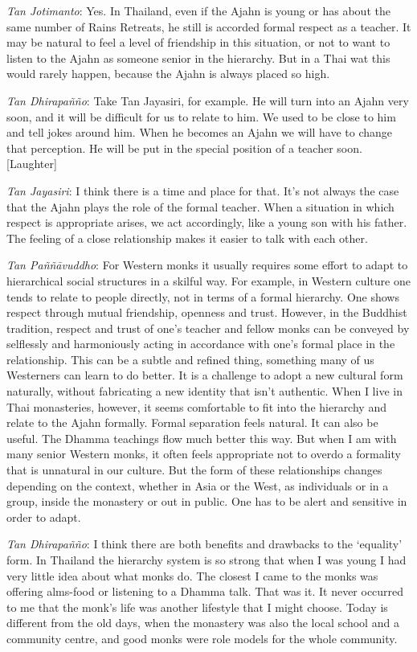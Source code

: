 \emph{Tan Jotimanto}: Yes. In Thailand, even if the Ajahn is young or
has about the same number of Rains Retreats, he still is accorded formal
respect as a teacher. It may be natural to feel a level of friendship in
this situation, or not to want to listen to the Ajahn as someone senior
in the hierarchy. But in a Thai wat this would rarely happen, because
the Ajahn is always placed so high.

\emph{Tan Dhirapañño}‎: Take Tan Jayasiri, for example. He will turn
into an Ajahn very soon, and it will be difficult for us to relate to
him. We used to be close to him and tell jokes around him. When he
becomes an Ajahn we will have to change that perception. He will be put
in the special position of a teacher soon. {[}Laughter{]}

\emph{Tan Jayasiri}: I think there is a time and place for that. It's
not always the case that the Ajahn plays the role of the formal teacher.
When a situation in which respect is appropriate arises, we act
accordingly, like a young son with his father. The feeling of a close
relationship makes it easier to talk with each other.

\emph{Tan Paññāvuddho}‎: For Western monks it usually requires some
effort to adapt to hierarchical social structures in a skilful way. For
example, in Western culture one tends to relate to people directly, not
in terms of a formal hierarchy. One shows respect through mutual
friendship, openness and trust. However, in the Buddhist tradition,
respect and trust of one's teacher and fellow monks can be conveyed by
selflessly and harmoniously acting in accordance with one's formal place
in the relationship. This can be a subtle and refined thing, something
many of us Westerners can learn to do better. It is a challenge to adopt
a new cultural form naturally, without fabricating a new identity that
isn't authentic. When I live in Thai monasteries, however, it seems
comfortable to fit into the hierarchy and relate to the Ajahn formally.
Formal separation feels natural. It can also be useful. The Dhamma
teachings flow much better this way. But when I am with many senior
Western monks, it often feels appropriate not to overdo a formality that
is unnatural in our culture. But the form of these relationships changes
depending on the context, whether in Asia or the West, as individuals or
in a group, inside the monastery or out in public. One has to be alert
and sensitive in order to adapt.

\emph{Tan Dhirapañño}‎: I think there are both benefits and drawbacks to
the `equality' form. In Thailand the hierarchy system is so strong that
when I was young I had very little idea about what monks do. The closest
I came to the monks was offering alms-food or listening to a Dhamma
talk. That was it. It never occurred to me that the monk's life was
another lifestyle that I might choose. Today is different from the old
days, when the monastery was also the local school and a community
centre, and good monks were role models for the whole community.


